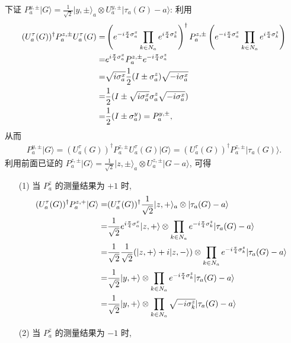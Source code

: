 \documentclass{assignment}
\begin{document}
\begin{pf}
    下证 $P_a^{y,\pm}\lvert G\rangle=\frac{1}{\sqrt{2}}\lvert y,\pm\rangle_a\otimes U_a^{y,\pm}\lvert\tau_a(G)-a\rangle$: 利用
    \begin{align}
        \notag(U_a^{\tau}(G))^{\dagger}P_a^{z,\pm}U_a^{\tau}(G)=&\left(e^{-i\frac{\pi}{4}\sigma_a^x}\prod_{k\in N_a}e^{i\frac{\pi}{4}\sigma_k^z}\right)^{\dagger}P_a^{z,\pm}\left(e^{-i\frac{\pi}{4}\sigma_a^x}\prod_{k\in N_a}e^{i\frac{\pi}{4}\sigma_k^z}\right)\\
        \notag=&e^{i\frac{\pi}{4}\sigma_a^x}P_a^{z,\pm}e^{-i\frac{\pi}{4}\sigma_a^z}\\
        \notag=&\sqrt{i\sigma_a^x}\frac{1}{2}(I\pm\sigma_a^z)\sqrt{-i\sigma_a^x}\\
        \notag=&\frac{1}{2}(I\pm\sqrt{i\sigma_a^x}\sigma_a^z\sqrt{-i\sigma_a^x})\\
        \notag=&\frac{1}{2}(I\pm\sigma_a^y)=P_a^{y,\pm},
    \end{align}
    从而
    \begin{align}
        P_a^{y,\pm}\lvert G\rangle=(U_a^{\tau}(G))^{\dagger}P_a^{z,\pm}U_a^{\tau}(G)\lvert G\rangle=(U_a^{\tau}(G))^{\dagger}P_a^{z,\pm}\lvert\tau_a(G)\rangle.
    \end{align}
    利用前面已证的 $P_a^{z,\pm}\lvert G\rangle=\frac{1}{\sqrt{2}}\lvert z,\pm\rangle_a\otimes U_a^{z,\pm}\lvert G-a\rangle$, 可得
    \begin{itemize}
        \item[(1)] 当 $P_a^z$ 的测量结果为 $+1$ 时,
        \begin{align}
            \notag(U_a^{\tau}(G))^{\dagger}P_a^{z,+}\lvert G\rangle=&(U_a^{\tau}(G))^{\dagger}\frac{1}{\sqrt{2}}\lvert z,+\rangle_a\otimes\lvert\tau_a(G)-a\rangle\\
            \notag=&\frac{1}{\sqrt{2}}e^{i\frac{\pi}{4}\sigma_a^x}\lvert z,+\rangle\otimes\prod_{k\in N_a}e^{-i\frac{\pi}{4}\sigma_k^z}\lvert\tau_a(G)-a\rangle\\
            \notag=&\frac{1}{\sqrt{2}}\frac{1}{\sqrt{2}}(\lvert z,+\rangle+i\lvert z,-\rangle)\otimes\prod_{k\in N_a}e^{-i\frac{\pi}{4}\sigma_k^z}\lvert\tau_a(G)-a\rangle\\
            \notag=&\frac{1}{\sqrt{2}}\lvert y,+\rangle\otimes\prod_{k\in N_a}e^{-i\frac{\pi}{4}\sigma_k^z}\lvert\tau_a(G)-a\rangle\\
            =&\frac{1}{\sqrt{2}}\lvert y,+\rangle\otimes\prod_{k\in N_a}\sqrt{-i\sigma_k^z}\lvert\tau_a(G)-a\rangle
        \end{align}
        \item[(2)] 当 $P_a^z$ 的测量结果为 $-1$ 时,

\end{itemize}
\end{pf}
\end{document}
